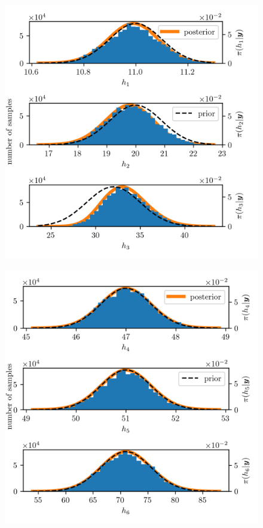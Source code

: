 \begin{figure}[ht!]
	\centering
	\includegraphics{PHdPTPost0.png}
	\caption[]{}
	\label{fig:PostHistTT0}
\end{figure}
\begin{figure}[ht!]
	\centering
	\includegraphics{PHdPTPost1.png}
	\caption[]{}
	\label{fig:PostHistTT1}
\end{figure}
